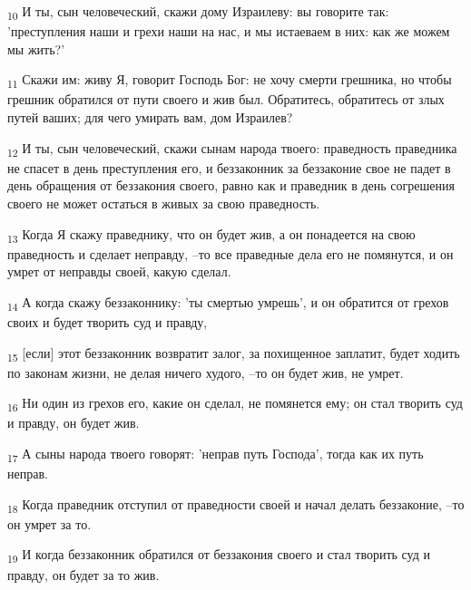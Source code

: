 \begin{tcolorbox}
\textsubscript{10} И ты, сын человеческий, скажи дому Израилеву: вы говорите так: 'преступления наши и грехи наши на нас, и мы истаеваем в них: как же можем мы жить?'
\end{tcolorbox}
\begin{tcolorbox}
\textsubscript{11} Скажи им: живу Я, говорит Господь Бог: не хочу смерти грешника, но чтобы грешник обратился от пути своего и жив был. Обратитесь, обратитесь от злых путей ваших; для чего умирать вам, дом Израилев?
\end{tcolorbox}
\begin{tcolorbox}
\textsubscript{12} И ты, сын человеческий, скажи сынам народа твоего: праведность праведника не спасет в день преступления его, и беззаконник за беззаконие свое не падет в день обращения от беззакония своего, равно как и праведник в день согрешения своего не может остаться в живых за свою праведность.
\end{tcolorbox}
\begin{tcolorbox}
\textsubscript{13} Когда Я скажу праведнику, что он будет жив, а он понадеется на свою праведность и сделает неправду, --то все праведные дела его не помянутся, и он умрет от неправды своей, какую сделал.
\end{tcolorbox}
\begin{tcolorbox}
\textsubscript{14} А когда скажу беззаконнику: 'ты смертью умрешь', и он обратится от грехов своих и будет творить суд и правду,
\end{tcolorbox}
\begin{tcolorbox}
\textsubscript{15} [если] этот беззаконник возвратит залог, за похищенное заплатит, будет ходить по законам жизни, не делая ничего худого, --то он будет жив, не умрет.
\end{tcolorbox}
\begin{tcolorbox}
\textsubscript{16} Ни один из грехов его, какие он сделал, не помянется ему; он стал творить суд и правду, он будет жив.
\end{tcolorbox}
\begin{tcolorbox}
\textsubscript{17} А сыны народа твоего говорят: 'неправ путь Господа', тогда как их путь неправ.
\end{tcolorbox}
\begin{tcolorbox}
\textsubscript{18} Когда праведник отступил от праведности своей и начал делать беззаконие, --то он умрет за то.
\end{tcolorbox}
\begin{tcolorbox}
\textsubscript{19} И когда беззаконник обратился от беззакония своего и стал творить суд и правду, он будет за то жив.
\end{tcolorbox}
